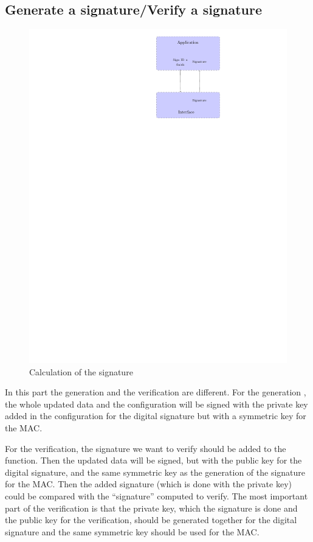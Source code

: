 \subsection*{Generate a signature/Verify a signature}
\begin{figure}[!ht]
\centering
\includegraphics[trim=18.5cm 20.5cm 13.5cm 0cm]{figures/sign_example_finish.pdf}
\caption{Calculation of the signature}
\label{fig:gci_sign_finish}
\end{figure}
In this part the generation and the verification are different.
For the generation , the whole updated data and the configuration will be signed
with the private key added in the configuration for the digital
signature but with a symmetric key for the MAC.

For the verification, the signature we want to verify should be added to the
function.
Then the updated data will be signed, but with the public key for the
digital signature, and the same symmetric key as the generation of the
signature for the MAC.
Then the added signature (which is done with the
private key) could be compared with the ``signature'' computed to verify.
The most important part of the verification is that the private key, which
the signature is done and the public key for the verification, should be
generated together for the digital signature and the same symmetric key should
be used for the MAC.

